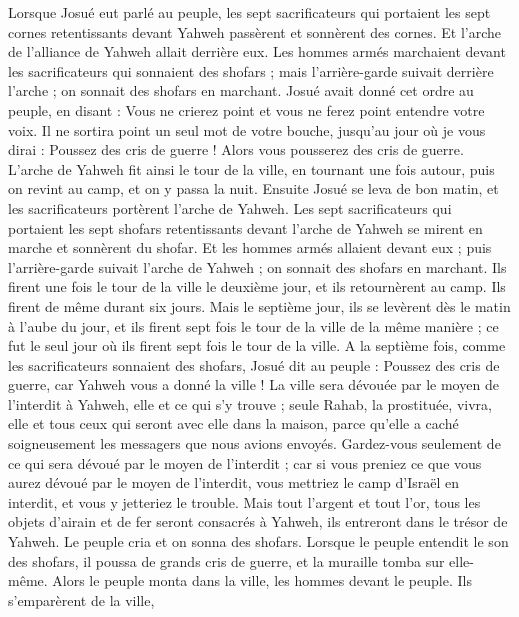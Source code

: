 \begin{multicols}{2}
Lorsque Josué eut parlé au peuple, les sept sacrificateurs qui portaient les sept cornes retentissants devant Yahweh passèrent et sonnèrent des cornes. Et l’arche de l’alliance de Yahweh allait derrière eux.
Les hommes armés marchaient devant les sacrificateurs qui sonnaient des shofars ; mais l’arrière-garde suivait derrière l’arche ; on sonnait des shofars en marchant.
Josué avait donné cet ordre au peuple, en disant : Vous ne crierez point et vous ne ferez point entendre votre voix. Il ne sortira point un seul mot de votre bouche, jusqu’au jour où je vous dirai : Poussez des cris de guerre ! Alors vous pousserez des cris de guerre.
L’arche de Yahweh fit ainsi le tour de la ville, en tournant une fois autour, puis on revint au camp, et on y passa la nuit.
Ensuite Josué se leva de bon matin, et les sacrificateurs portèrent l’arche de Yahweh.
Les sept sacrificateurs qui portaient les sept shofars retentissants devant l’arche de Yahweh se mirent en marche et sonnèrent du shofar. Et les hommes armés allaient devant eux ; puis l’arrière-garde suivait l’arche de Yahweh ; on sonnait des shofars en marchant.
Ils firent une fois le tour de la ville le deuxième jour, et ils retournèrent au camp. Ils firent de même durant six jours.
Mais le septième jour, ils se levèrent dès le matin à l’aube du jour, et ils firent sept fois le tour de la ville de la même manière ; ce fut le seul jour où ils firent sept fois le tour de la ville.
A la septième fois, comme les sacrificateurs sonnaient des shofars, Josué dit au peuple : Poussez des cris de guerre, car Yahweh vous a donné la ville !
La ville sera dévouée par le moyen de l'interdit à Yahweh, elle et ce qui s’y trouve ; seule Rahab, la prostituée, vivra, elle et tous ceux qui seront avec elle dans la maison, parce qu’elle a caché soigneusement les messagers que nous avions envoyés.
Gardez-vous seulement de ce qui sera dévoué par le moyen de l'interdit ; car si vous preniez ce que vous aurez dévoué par le moyen de l'interdit, vous mettriez le camp d’Israël en interdit, et vous y jetteriez le trouble.
Mais tout l’argent et tout l’or, tous les objets d’airain et de fer seront consacrés à Yahweh, ils entreront dans le trésor de Yahweh.
Le peuple cria et on sonna des shofars. Lorsque le peuple entendit le son des shofars, il poussa de grands cris de guerre, et la muraille tomba sur elle-même. Alors le peuple monta dans la ville, les hommes devant le peuple. Ils s’emparèrent de la ville,

\end{multicols}
